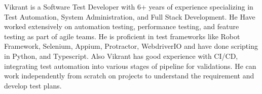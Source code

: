 

\begin{cvparagraph}

Vikrant is a Software Test Developer with 6+ years of experience specializing in Test Automation, System Administration, and Full Stack Development. He Have worked extensively on automation testing, performance testing, and feature testing as part of agile teams. He is proficient in test frameworks like Robot Framework, Selenium, Appium, Protractor, WebdriverIO and have done scripting in Python, and Typescript. Also Vikrant has good experience with CI/CD, integrating test automation into various stages of pipeline for validations. He can work independently from scratch on projects to understand the requirement and develop test plans.
\end{cvparagraph}
